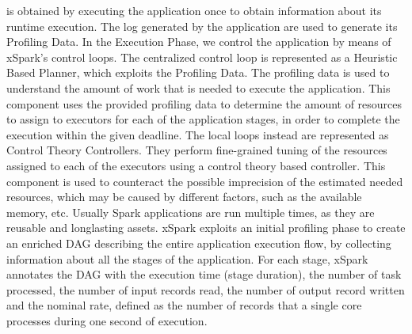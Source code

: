 is obtained by executing the application once to obtain information
about its runtime execution. The log generated by the application are used to generate its Profiling Data.
In the Execution Phase, we control the application by means of xSpark’s control loops. 
The centralized control loop is represented as a Heuristic Based Planner, which exploits the Profiling Data. The profiling data is used to understand the amount of
work that is needed to execute the application. This component uses the provided profiling data to determine the amount of resources to assign to executors for each of the application stages, in order to complete the execution within the given deadline. The
local loops instead are represented as Control Theory Controllers. They
perform fine-grained tuning of the resources assigned to each of the
executors using a control theory based controller. This component is
used to counteract the possible imprecision of the estimated needed
resources, which may be caused by different factors, such as the available
memory, etc.
Usually Spark applications are run multiple times, as they are reusable and longlasting assets. xSpark exploits an initial profiling phase to create an enriched DAG describing the entire application execution flow, by collecting information about all the stages of the application. For each stage, xSpark annotates the DAG with the execution time (stage duration), the number of task processed, the number of input records read, the number of
output record written and the nominal rate, defined as the number of
records that a single core processes during one second of execution. 




